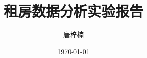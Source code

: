 \documentclass[12pt]{ctexart}
\begin{document}


\newpage

\tableofcontents
\newpage

\title{租房数据分析实验报告}
\author{唐梓楠}
\date{\today}

\newpage
\printbibliography
\end{document}
